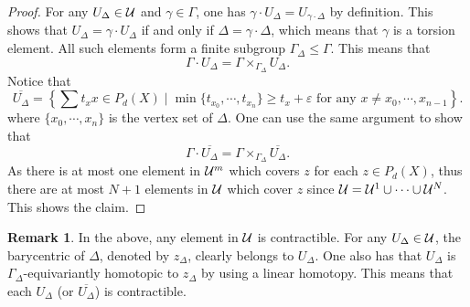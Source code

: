 \documentclass[11pt]{article}
\theoremstyle{definition}
\newtheorem{Rem}[Def]{Remark}
\theoremstyle{plain}
\def\Ga{\Gamma}
\begin{document}
\begin{proof}
For any $U_{\Delta}\in\mathcal U$ and $\gamma\in\Ga$, one has $\gamma\cdot U_{\Delta}=U_{\gamma\cdot\Delta}$ by definition. This shows that $U_{\Delta}=\gamma\cdot U_{\Delta}$ if and only if $\Delta=\gamma\cdot\Delta$, which means that $\gamma$ is a torsion element. All such elements form a finite subgroup $\Ga_{\Delta}\leq \Ga$. This means that
$$\Gamma\cdot U_{\Delta}=\Ga\times_{\Ga_{\Delta}} U_{\Delta}.$$
Notice that
$$\overline{U_{\Delta}}=\left\{\sum t_xx\in P_d(X)\mid \min\{t_{x_0},\cdots,t_{x_n}\}\geq t_x+\varepsilon\text{ for any }x\ne x_0,\cdots,x_{n-1} \right\}.$$
where $\{x_0,\cdots,x_n\}$ is the vertex set of $\Delta$. One can use the same argument to show that 
$$\Gamma\cdot\overline{U_{\Delta}}=\Ga\times_{\Ga_{\Delta}}\overline{U_{\Delta}}.$$
As there is at most one element in $\mathcal U^m$ which covers $z$ for each $z\in P_d(X)$, thus there are at most $N+1$ elements in $\mathcal U$ which cover $z$ since $\mathcal U=\mathcal U^1\cup\cdots\cup\mathcal U^N$. This shows the claim.
\end{proof}

\begin{Rem}
In the above, any element in $\mathcal U$ is contractible. For any $U_{\Delta}\in\mathcal U$, the barycentric of $\Delta$, denoted by $z_{\Delta}$, clearly belongs to $U_{\Delta}$. One also has that $U_{\Delta}$ is $\Ga_{\Delta}$-equivariantly homotopic to $z_{\Delta}$ by using a linear homotopy. This means that each $U_{\Delta}$ (or $\overline{U_{\Delta}}$) is contractible.
\end{Rem}
\end{document}
